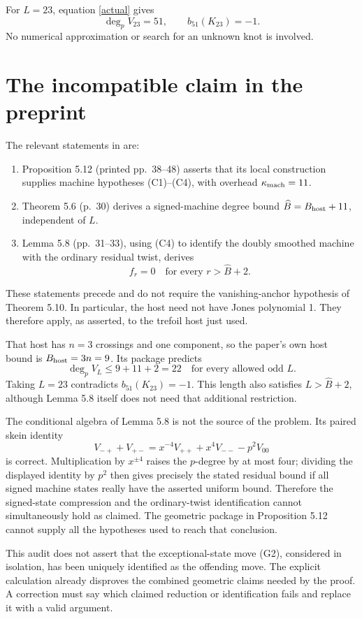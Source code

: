 \documentclass[11pt]{article}
\begin{document}
For $L=23$, equation \eqref{actual} gives
\[
\boxed{\deg_p V_{23}=51,\qquad b_{51}(K_{23})=-1.}
\]
No numerical approximation or search for an unknown knot is involved.

\section*{The incompatible claim in the preprint}
The relevant statements in \cite{CC} are:
\begin{enumerate}
\item Proposition 5.12 (printed pp.~38--48) asserts that its local construction supplies machine hypotheses (C1)--(C4), with overhead $\kappa_{\rm mach}=11$.
\item Theorem 5.6 (p.~30) derives a signed-machine degree bound $\widehat B=B_{\rm host}+11$, independent of $L$.
\item Lemma 5.8 (pp.~31--33), using (C4) to identify the doubly smoothed machine with the ordinary residual twist, derives
\[
f_r=0\quad\text{for every }r>\widehat B+2.
\]
\end{enumerate}
These statements precede and do not require the vanishing-anchor hypothesis of Theorem 5.10. In particular, the host need not have Jones polynomial 1. They therefore apply, as asserted, to the trefoil host just used.

That host has $n=3$ crossings and one component, so the paper's own host bound is $B_{\rm host}=3n=9$. Its package predicts
\[
\boxed{\deg_p V_L\le 9+11+2=22\quad\text{for every allowed odd }L.}
\]
Taking $L=23$ contradicts $b_{51}(K_{23})=-1$. This length also satisfies $L>\widehat B+2$, although Lemma 5.8 itself does not need that additional restriction.

The conditional algebra of Lemma 5.8 is not the source of the problem. Its paired skein identity
\[
V_{-+}+V_{+-}=x^{-4}V_{++}+x^4V_{--}-p^2V_{00}
\]
is correct. Multiplication by $x^{\pm4}$ raises the $p$-degree by at most four; dividing the displayed identity by $p^2$ then gives precisely the stated residual bound if all signed machine states really have the asserted uniform bound. Therefore the signed-state compression and the ordinary-twist identification cannot simultaneously hold as claimed. The geometric package in Proposition 5.12 cannot supply all the hypotheses used to reach that conclusion.

This audit does not assert that the exceptional-state move (G2), considered in isolation, has been uniquely identified as the offending move. The explicit calculation already disproves the combined geometric claims needed by the proof. A correction must say which claimed reduction or identification fails and replace it with a valid argument.
\end{document}

